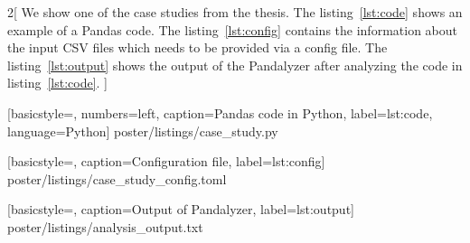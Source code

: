 \Large
\setlength{\columnsep}{20cm}
\begin{multicols}{2}[
We show one of the case studies from the thesis. The listing~\ref{lst:code} shows an example of a Pandas code.
The listing~\ref{lst:config} contains the information about the input CSV files which needs to be provided via a config file.
The listing~\ref{lst:output} shows the output of the Pandalyzer after analyzing the code in listing~\ref{lst:code}.
]





    [basicstyle=\normalsize\ttfamily, numbers=left, caption=Pandas code in Python, label={lst:code}, language=Python]
    {poster/listings/case_study.py}

\vfill\null
\columnbreak


    [basicstyle=\normalsize\ttfamily, caption=Configuration file, label={lst:config}]
    {poster/listings/case_study_config.toml}

    [basicstyle=\normalsize\ttfamily, caption=Output of Pandalyzer, label={lst:output}]
    {poster/listings/analysis_output.txt}

\end{multicols}